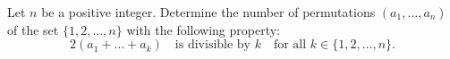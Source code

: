 Let $n$ be a positive integer. Determine the number of permutations $(a_1,\ldots,a_n)$ of
the set $\{1,2,\ldots, n\}$ with the following property:
$$2(a_1+\ldots+a_k) \quad \text{is divisible by $k$} \quad \text{for all } k\in\{1,2,\ldots,n\}.$$
